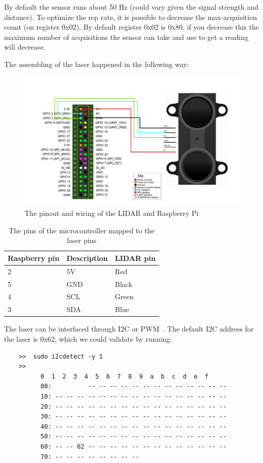 By default the sensor runs about 50 Hz (could vary given the signal strength and distance). To optimize the rep rate, it is possible to decrease the max-acquisition count (on register 0x02). By default register 0x02 is 0x80, if you decrease this the maximum number of acquisitions the sensor can take and use to get a reading will decrease\cite{reprate}.

\pagebreak
The assembling of the laser happened in the following way:

\begin{figure}[H]
	\centering
	\includegraphics[scale=.3]{images/laderraspberryconnection.png}
	\caption{The pinout and wiring of the LIDAR and Raspberry Pi}
	\label{fig:wiringlidarpi}
\end{figure}

\begin{table}[H]
	\centering
	\begin{tabular}{|l|l|l|}
		\hline
		\textbf{Raspberry pin} & \textbf{Description} & \textbf{LIDAR pin} \\ \hline
		2 & 5V & Red \\ \hline
		5 & GND & Black \\ \hline
		4 & SCL & Green \\ \hline
		3 & SDA & Blue \\ \hline
	\end{tabular}
	\caption{The pins of the microcontroller mapped to the laser pins}
\end{table}

The laser can be interfaced through I2C or PWM~\cite{lidarsum}. The default I2C address for the laser is 0x62, which we could validate by running:
\lstset{language=sh}
\begin{lstlisting}
	>>	sudo i2cdetect -y 1
	>>
		  0  1  2  3  4  5  6  7  8  9  a  b  c  d  e  f
		  00:          -- -- -- -- -- -- -- -- -- -- -- -- --
		  10: -- -- -- -- -- -- -- -- -- -- -- -- -- -- -- --
		  20: -- -- -- -- -- -- -- -- -- -- -- -- -- -- -- --
		  30: -- -- -- -- -- -- -- -- -- -- -- -- -- -- -- --
		  40: -- -- -- -- -- -- -- -- -- -- -- -- -- -- -- --
		  50: -- -- -- -- -- -- -- -- -- -- -- -- -- -- -- --
		  60: -- -- 62 -- -- -- -- -- -- -- -- -- -- -- -- --
		  70: -- -- -- -- -- -- -- -- 
\end{lstlisting}

